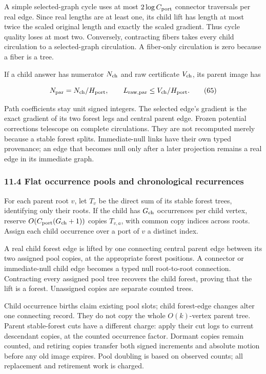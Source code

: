 A simple selected-graph cycle uses at most \(2\log C_{\rm port}\) connector traversals per real edge. Since real lengths are at least one, its child lift has length at most twice the scaled original length and exactly the scaled gradient. Thus cycle quality loses at most two. Conversely, contracting fibers takes every child circulation to a selected-graph circulation. A fiber-only circulation is zero because a fiber is a tree.

If a child answer has numerator \(N_{\rm ch}\) and raw certificate \(V_{\rm ch}\), its parent image has

\[
N_{\rm par}=N_{\rm ch}/H_{\rm port},\qquad
 L_{\rm raw,par}\leq V_{\rm ch}/H_{\rm port}.
 \tag{65}
\]

Path coefficients stay unit signed integers. The selected edge's gradient is the exact gradient of its two forest legs and central parent edge. Frozen potential corrections telescope on complete circulations. They are not recomputed merely because a stable forest splits. Immediate-null links have their own typed provenance; an edge that becomes null only after a later projection remains a real edge in its immediate graph.

\hypertarget{af-46593eb93e-flat-occurrence-pools-and-chronological-recurrences}{%
\subsubsection{11.4 Flat occurrence pools and chronological recurrences}\label{af-46593eb93e-flat-occurrence-pools-and-chronological-recurrences}}

For each parent root \(v\), let \(T_v\) be the direct sum of its stable forest trees, identifying only their roots. If the child has \(G_{\rm ch}\) occurrences per child vertex, reserve \(O(C_{\rm port}(G_{\rm ch}+1))\) copies \(T_{v,a}\), with common copy indices across roots. Assign each child occurrence over a port of \(v\) a distinct index.

A real child forest edge is lifted by one connecting central parent edge between its two assigned pool copies, at the appropriate forest positions. A connector or immediate-null child edge becomes a typed null root-to-root connection. Contracting every assigned pool tree recovers the child forest, proving that the lift is a forest. Unassigned copies are separate counted trees.

Child occurrence births claim existing pool slots; child forest-edge changes alter one connecting record. They do not copy the whole \(O(k)\)-vertex parent tree. Parent stable-forest cuts have a different charge: apply their cut logs to current descendant copies, at the counted occurrence factor. Dormant copies remain counted, and retiring copies transfer both signed increments and absolute motion before any old image expires. Pool doubling is based on observed counts; all replacement and retirement work is charged.

